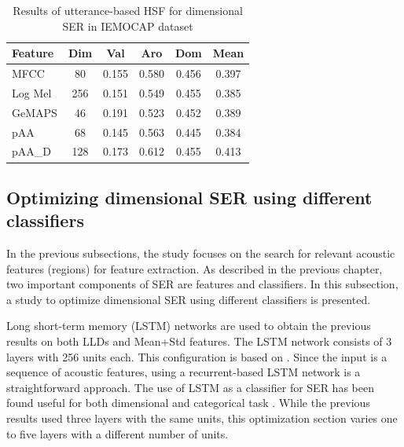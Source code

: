 
\begin{table}
    \caption{Results of utterance-based HSF for dimensional SER in IEMOCAP dataset}
    \begin{center}
    \begin{tabular}{l | c | c c c c}
      \hline
Feature & Dim & Val & Aro & Dom & Mean \\
\hline \hline
MFCC      &   80  & 0.155 & 0.580   & 0.456 & 0.397 \\
Log Mel   &   256 & 0.151 & 0.549   & 0.455 & 0.385 \\
GeMAPS    &   46  & 0.191 & 0.523   & 0.452 & 0.389 \\
pAA       &   68  & 0.145 & 0.563   & 0.445 & 0.384 \\
pAA\_D     &  128  & 0.173 & 0.612   & 0.455 & 0.413 \\
      \hline
    \end{tabular}
    \label{tab:iemocap-hsf}
  \end{center}
\end{table}

\subsection{Optimizing dimensional SER using different classifiers}
In the previous subsections, the study focuses on the search for relevant
acoustic features (regions) for feature extraction. As described in the
previous chapter, two important components of SER are features and classifiers.
In this subsection, a study to optimize dimensional SER using different
classifiers is presented. 

Long short-term memory (LSTM) networks are used to obtain the previous results
on both LLDs and Mean+Std features. The LSTM network consists of 3 layers with
256 units each. This configuration is based on \cite{Atmaja2020d}. Since the
input is a sequence of acoustic features, using a recurrent-based LSTM network
is a straightforward approach. The use of LSTM as a classifier for SER has been
found useful for both dimensional \cite{Schmitt2018} and categorical task
\cite{Atmaja2019}. While the previous results used three layers with the same
units, this optimization section varies one to five layers with a different
number of units.

